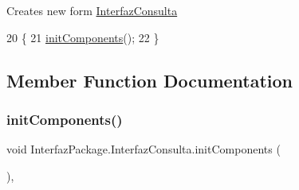 Creates new form \mbox{\hyperlink{class_interfaz_package_1_1_interfaz_consulta}{Interfaz\+Consulta}} 
\begin{DoxyCode}
20                               \{
21         \mbox{\hyperlink{class_interfaz_package_1_1_interfaz_consulta_a18ee0dacb0079aa269b82f998af3db37}{initComponents}}();
22     \}
\end{DoxyCode}


\subsection{Member Function Documentation}
\mbox{\label{class_interfaz_package_1_1_interfaz_consulta_a18ee0dacb0079aa269b82f998af3db37}} 
\subsubsection{\texorpdfstring{init\+Components()}{initComponents()}}
{\footnotesize\ttfamily void Interfaz\+Package.\+Interfaz\+Consulta.\+init\+Components (\begin{DoxyParamCaption}{ }\end{DoxyParamCaption})\hspace{0.3cm}{\ttfamily [inline]}, {\ttfamily [private]}}


